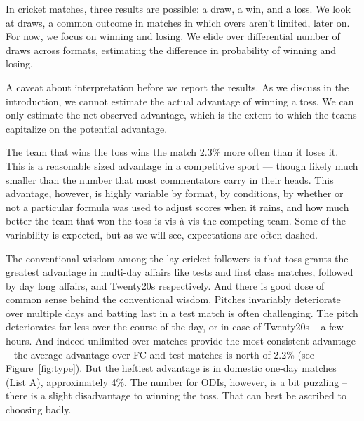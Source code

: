 \documentclass[12pt]{article}
\begin{document}
In cricket matches, three results are possible: a draw, a win, and a loss. We look at draws, a common outcome in matches in which overs aren't limited, later on. For now, we focus on winning and losing. We elide over differential number of draws across formats, estimating the difference in probability of winning and losing. 

A caveat about interpretation before we report the results. As we discuss in the introduction, we cannot estimate the actual advantage of winning a toss. We can only estimate the net observed advantage, which is the extent to which the teams capitalize on the potential advantage. 

The team that wins the toss wins the match 2.3\% more often than it loses it. This is a reasonable sized advantage in a competitive sport --- though likely much smaller than the number that most commentators carry in their heads. This advantage, however, is highly variable by format, by conditions, by whether or not a particular formula was used to adjust scores when it rains, and how much better the team that won the toss is vis-\`{a}-vis the competing team. Some of the variability is expected, but as we will see, expectations are often dashed. 

The conventional wisdom among the lay cricket followers is that toss grants the greatest advantage in multi-day affairs like tests and first class matches, followed by day long affairs, and Twenty20s respectively. And there is good dose of common sense behind the conventional wisdom. Pitches invariably deteriorate over multiple days and batting last in a test match is often challenging. The pitch deteriorates far less over the course of the day, or in case of Twenty20s -- a few hours. And indeed unlimited over matches provide the most consistent advantage -- the average advantage over FC and test matches is north of 2.2\% (see Figure~\ref{fig:type}). But the heftiest advantage is in domestic one-day matches (List A), approximately 4\%. The number for ODIs, however, is a bit puzzling -- there is a slight disadvantage to winning the toss. That can best be ascribed to choosing badly.      
\end{document}
